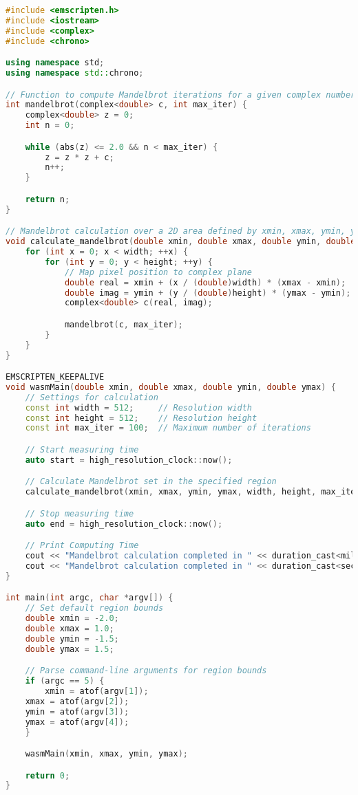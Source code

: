\begin{lstlisting}[language=C++, frame=tb, caption={Mandelbrot Set Calculation (WASM build)}]
#include <emscripten.h>
#include <iostream>
#include <complex>
#include <chrono>

using namespace std;
using namespace std::chrono;

// Function to compute Mandelbrot iterations for a given complex number
int mandelbrot(complex<double> c, int max_iter) {
    complex<double> z = 0;
    int n = 0;

    while (abs(z) <= 2.0 && n < max_iter) {
        z = z * z + c;
        n++;
    }

    return n;
}

// Mandelbrot calculation over a 2D area defined by xmin, xmax, ymin, ymax
void calculate_mandelbrot(double xmin, double xmax, double ymin, double ymax, int width, int height, int max_iter) {
    for (int x = 0; x < width; ++x) {
        for (int y = 0; y < height; ++y) {
            // Map pixel position to complex plane
            double real = xmin + (x / (double)width) * (xmax - xmin);
            double imag = ymin + (y / (double)height) * (ymax - ymin);
            complex<double> c(real, imag);

            mandelbrot(c, max_iter);
        }
    }
}

EMSCRIPTEN_KEEPALIVE
void wasmMain(double xmin, double xmax, double ymin, double ymax) {
    // Settings for calculation
    const int width = 512;     // Resolution width
    const int height = 512;    // Resolution height
    const int max_iter = 100;  // Maximum number of iterations

    // Start measuring time
    auto start = high_resolution_clock::now();

    // Calculate Mandelbrot set in the specified region
    calculate_mandelbrot(xmin, xmax, ymin, ymax, width, height, max_iter);

    // Stop measuring time
    auto end = high_resolution_clock::now();

    // Print Computing Time
    cout << "Mandelbrot calculation completed in " << duration_cast<milliseconds>(end - start).count() << "[ms]" << endl;
    cout << "Mandelbrot calculation completed in " << duration_cast<seconds>(end - start).count() << "[s]" << endl;
}

int main(int argc, char *argv[]) {
    // Set default region bounds
    double xmin = -2.0;
    double xmax = 1.0;
    double ymin = -1.5;
    double ymax = 1.5;

    // Parse command-line arguments for region bounds
    if (argc == 5) {
        xmin = atof(argv[1]);
	xmax = atof(argv[2]);
	ymin = atof(argv[3]);
	ymax = atof(argv[4]);
    }

    wasmMain(xmin, xmax, ymin, ymax);

    return 0;
}
\end{lstlisting}

